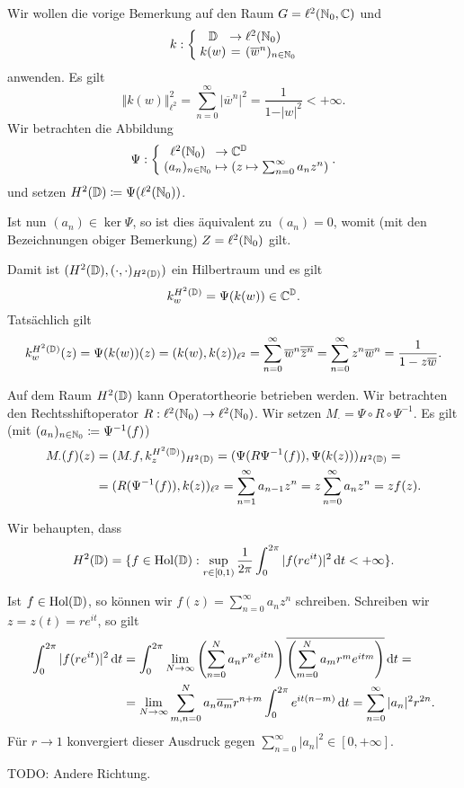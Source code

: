 \begin{example}
    Wir wollen die vorige Bemerkung auf den Raum $G = \ell^2(\mathbb{N}_0, \mathbb{C})$ und
    $$ \mapping{k}{\D & \to & \ell^2(\N_0)}{k(w) & = & (\overline{w}^n)_{n \in \N_0}} $$
    anwenden. Es gilt
    $$ \Vert k(w) \Vert_{\ell^2}^2 = \sum_{n = 0}^\infty \vert \overline{w}^n \vert^2 = \frac{1}{1 - \vert w \vert^2} < +\infty. $$
    Wir betrachten die Abbildung
    $$ \mapping{\Psi}{\ell^2(\N_0) & \to & \C^\D}{(a_n)_{n \in \N_0} & \mapsto & (z \mapsto \sum_{n=0}^\infty a_n z^n)}. $$
    und setzen $H^2(\mathbb{D}) \coloneqq \Psi(\ell^2(\mathbb{N}_0))$.

    Ist nun $(a_n) \in \ker \Psi$, so ist dies äquivalent zu $(a_n) = 0$, womit (mit den Bezeichnungen obiger Bemerkung) $Z = \ell^2(\mathbb{N}_0)$ gilt.

    Damit ist $(H^2(\mathbb{D}), (\cdot, \cdot)_{H^2(\mathbb{D})})$ ein Hilbertraum und es gilt
    $$ k_w^{H^2(\mathbb{D})} = \Psi(k(w)) \in \mathbb{C}^{\mathbb{D}}. $$
    Tatsächlich gilt
    $$ k_w^{H^2(\mathbb{D})}(z) = \Psi(k(w))(z) = (k(w), k(z))_{\ell^2} = \sum_{n=0}^\infty \overline{w}^n \overline{\overline{z}^n} = \sum_{n=0}^\infty z^n \overline{w}^n = \frac{1}{1 - z \overline{w}}. $$
\end{example}

\begin{remark}
Auf dem Raum $H^2(\mathbb{D})$ kann Operatortheorie betrieben werden. Wir betrachten den Rechtsshiftoperator $R : \ell^2(\mathbb{N}_0) \to \ell^2(\mathbb{N}_0)$. Wir setzen $M_\cdot = \Psi \circ R \circ \Psi^{-1}$. Es gilt (mit $(a_n)_{n \in \mathbb{N}_0} \coloneqq \Psi^{-1}(f)$)
\begin{align*}
    M_\cdot (f)(z) &= (M_\cdot f, k_z^{H^2(\mathbb{D})})_{H^2(\mathbb{D})} = (\Psi(R\Psi^{-1}(f)), \Psi(k(z)))_{H^2(\mathbb{D})} = \\ &= (R(\Psi^{-1}(f)), k(z))_{\ell^2} = \sum_{n=1}^\infty a_{n-1} z^n = z \sum_{n=0}^\infty a_n z^n = z f(z).
\end{align*}
\end{remark}

\begin{remark}
    Wir behaupten, dass
    $$ H^2(\mathbb{D}) = \{ f \in \mathrm{Hol}(\mathbb{D}) : \sup_{r \in [0, 1)} \frac{1}{2 \pi} \int_0^{2 \pi} \vert f(re^{it}) \vert^2 \mathop{}\!\mathrm{d} t < +\infty \}. $$

    Ist $f \in \mathrm{Hol}(\mathbb{D})$, so können wir $f(z) = \sum_{n=0}^\infty a_n z^n$ schreiben. Schreiben wir $z = z(t) = re^{it}$, so gilt
    \begin{align*}
        \int_0^{2 \pi} \vert f(re^{it}) \vert^2 \mathop{}\!\mathrm{d} t &= \int_0^{2 \pi} \lim_{N \to \infty} \left( \sum_{n=0}^N a_n r^n e^{itn} \right) \overline{\left( \sum_{m=0}^N a_m r^m e^{itm} \right) } \mathop{}\!\mathrm{d} t = \\
        &= \lim_{N \to \infty} \sum_{m,n=0}^N a_n \overline{a_m} r^{n+m} \int_{0}^{2\pi} e^{it(n-m)} \mathop{}\!\mathrm{d} t = \sum_{n=0}^\infty \vert a_n \vert^2 r^{2n}.
    \end{align*}
    Für $r \to 1$ konvergiert dieser Ausdruck gegen $\sum_{n=0}^\infty \vert a_n \vert^2 \in [0, +\infty]$.

    TODO: Andere Richtung.
\end{remark}

